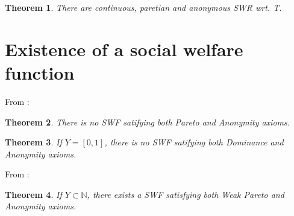 \documentclass{article}
\newtheorem{theorem}{Theorem}
\begin{document}
\begin{theorem}
    There are continuous, paretian and anonymous SWR wrt. T.
\end{theorem}

\section{Existence of a social welfare function}

From \cite{basumitra03}:

\begin{theorem}
  There is no SWF satifying both Pareto and Anonymity axioms.
\end{theorem}

\begin{theorem}
  If $Y=[0,1]$, there is no SWF satifying both Dominance and Anonymity axioms.
\end{theorem}

From \cite{basumitra07p}:

\begin{theorem}
  If $Y\subset\mathbb N$, there exists a SWF satisfying both Weak Pareto and Anonymity axioms.
\end{theorem}



\end{document}
